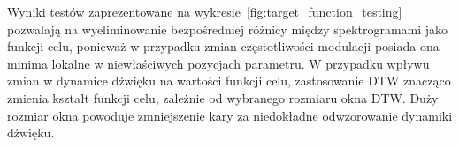 Wyniki testów zaprezentowane na wykresie~\ref{fig:target_function_testing} pozwalają na wyeliminowanie
bezpośredniej różnicy między spektrogramami jako funkcji celu, ponieważ w przypadku zmian częstotliwości
modulacji posiada ona minima lokalne w niewłaściwych pozycjach parametru. W przypadku wpływu 
zmian w dynamice dźwięku na wartości funkcji celu, zastosowanie DTW znacząco zmienia kształt funkcji celu,
zależnie od wybranego rozmiaru okna DTW\@. Duży rozmiar okna powoduje zmniejszenie kary za niedokładne
odwzorowanie dynamiki dźwięku.



